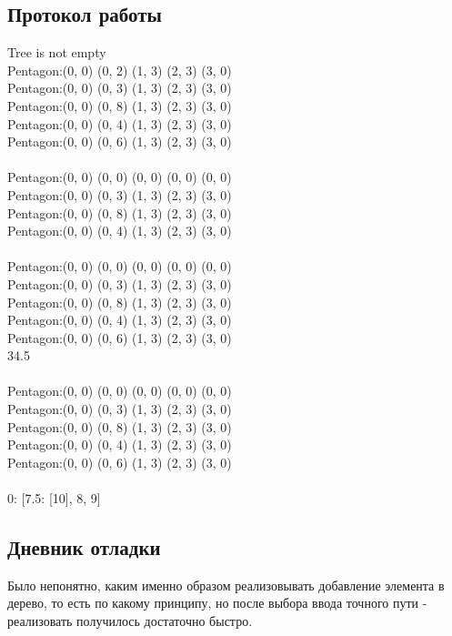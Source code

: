 \documentclass[12pt]{article}
\begin{document}
\subsection*{Протокол работы}
Tree is not empty \\
Pentagon:(0, 0) (0, 2) (1, 3) (2, 3) (3, 0) \\
Pentagon:(0, 0) (0, 3) (1, 3) (2, 3) (3, 0) \\
Pentagon:(0, 0) (0, 8) (1, 3) (2, 3) (3, 0) \\
Pentagon:(0, 0) (0, 4) (1, 3) (2, 3) (3, 0) \\
Pentagon:(0, 0) (0, 6) (1, 3) (2, 3) (3, 0) \\
 \\
Pentagon:(0, 0) (0, 0) (0, 0) (0, 0) (0, 0) \\
Pentagon:(0, 0) (0, 3) (1, 3) (2, 3) (3, 0) \\
Pentagon:(0, 0) (0, 8) (1, 3) (2, 3) (3, 0) \\
Pentagon:(0, 0) (0, 4) (1, 3) (2, 3) (3, 0) \\
 \\
Pentagon:(0, 0) (0, 0) (0, 0) (0, 0) (0, 0) \\
Pentagon:(0, 0) (0, 3) (1, 3) (2, 3) (3, 0) \\
Pentagon:(0, 0) (0, 8) (1, 3) (2, 3) (3, 0) \\
Pentagon:(0, 0) (0, 4) (1, 3) (2, 3) (3, 0) \\
Pentagon:(0, 0) (0, 6) (1, 3) (2, 3) (3, 0) \\
34.5 \\
 \\
Pentagon:(0, 0) (0, 0) (0, 0) (0, 0) (0, 0) \\
Pentagon:(0, 0) (0, 3) (1, 3) (2, 3) (3, 0) \\
Pentagon:(0, 0) (0, 8) (1, 3) (2, 3) (3, 0) \\
Pentagon:(0, 0) (0, 4) (1, 3) (2, 3) (3, 0) \\
Pentagon:(0, 0) (0, 6) (1, 3) (2, 3) (3, 0) \\
 \\
0: [7.5: [10], 8, 9] \\

\subsection*{Дневник отладки}
Было непонятно, каким именно образом реализовывать добавление элемента в дерево, то есть по какому принципу, но после выбора ввода точного пути - реализовать получилось достаточно быстро.
\end{document}
